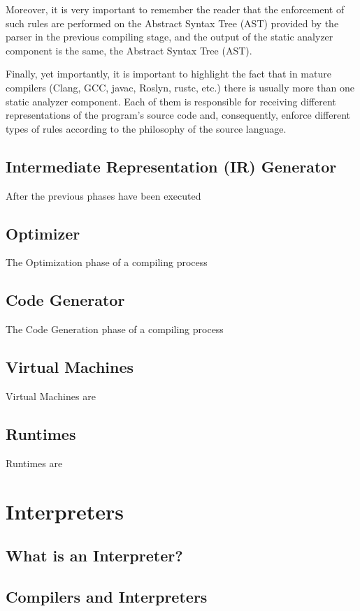 Moreover, it is very important to remember the reader that the enforcement of such rules are performed on the Abstract Syntax Tree (AST) provided by the parser in the previous compiling stage, and the output of the static analyzer component is the same, the Abstract Syntax Tree (AST).

Finally, yet importantly, it is important to highlight the fact that in mature compilers (Clang, GCC, javac, Roslyn, rustc, etc.) there is usually more than one static analyzer component. Each of them is responsible for receiving different representations of the program's source code and, consequently, enforce different types of rules according to the philosophy of the source language.

\subsection{Intermediate Representation (IR) Generator}
After the previous phases have been executed

\subsection{Optimizer}
The Optimization phase of a compiling process

\subsection{Code Generator}
The Code Generation phase of a compiling process


\subsection{Virtual Machines}
Virtual Machines are 

\subsection{Runtimes}
Runtimes are


\section{Interpreters}
\subsection{What is an Interpreter?}

\subsection{Compilers and Interpreters}



